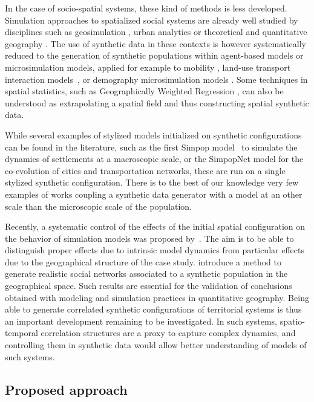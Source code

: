 \documentclass{bmcart}
\begin{document}
In the case of socio-spatial systems, these kind of methods is less developed. Simulation approaches to spatialized social systems are already well studied by disciplines such as geosimulation \cite{benenson2004geosimulation}, urban analytics \cite{batty2013new} or theoretical and quantitative geography \cite{pumain2018evolutionary}. The use of synthetic data in these contexts is however systematically reduced to the generation of synthetic populations within agent-based models or microsimulation models, applied for example to mobility \cite{banos2005simulating}, land-use transport interaction models~\cite{pritchard2009advances}, or demography microsimulation models \cite{birkin1988synthesis}. Some techniques in spatial statistics, such as Geographically Weighted Regression \cite{brunsdon1998geographically}, can also be understood as extrapolating a spatial field and thus constructing spatial synthetic data.


While several examples of stylized models initialized on synthetic configurations can be found in the literature, such as the first Simpop model~\cite{sanders1997simpop} to simulate the dynamics of settlements at a macroscopic scale, or the SimpopNet model \cite{schmitt2014modelisation} for the co-evolution of cities and transportation networks, these are run on a single stylized synthetic configuration. There is to the best of our knowledge very few examples of works coupling a synthetic data generator with a model at an other scale than the microscopic scale of the population. 

Recently, a systematic control of the effects of the initial spatial configuration on the behavior of simulation models was proposed by~\cite{raimbault2018space}. The aim is to be able to distinguish proper effects due to intrinsic model dynamics from particular effects due to the geographical structure of the case study. \cite{arentze2012modeling} introduce a method to generate realistic social networks associated to a synthetic population in the geographical space. Such results are essential for the validation of conclusions obtained with modeling and simulation practices in quantitative geography. Being able to generate correlated synthetic configurations of territorial systems is thus an important development remaining to be investigated. In such systems, spatio-temporal correlation structures are a proxy to capture complex dynamics, and controlling them in synthetic data would allow better understanding of models of such systems.


\subsection*{Proposed approach}
\end{document}
